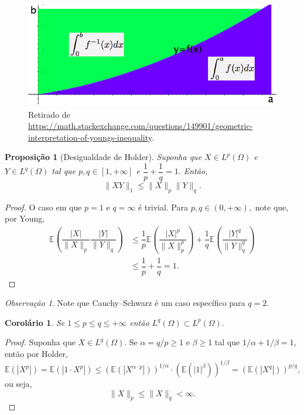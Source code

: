 \documentclass[12pt,a4paper,oneside]{book}
\newtheorem{proposition}[theorem]{Proposi\c{c}\~ao}
\newtheorem{corollary}[theorem]{Corol\'ario}
\theoremstyle{definition}
\theoremstyle{remark}
\newtheorem{remark}[theorem]{Observa\c{c}\~ao}
\numberwithin{equation}{section}
\newcommand{\E}{\mathbb{E}}
\begin{document}
\begin{figure}[h]\label{young-intuicao}
\centering %
\includegraphics[width=12cm]{intuicao-young} %
\caption{Retirado de \url{https://math.stackexchange.com/questions/149901/geometric-interpretation-of-youngs-inequality}.}
\end{figure}
 

\begin{proposition}[Desigualdade de Holder]
Suponha que $X\in L^p(\Omega)$ e $Y\in L^q(\Omega)$ tal que $p,q\in [1,+\infty]$ e 
$\dfrac{1}{p} +\dfrac{1}{q} = 1.$
Então, 
$$ \|XY\|_1\leq \|X \|_p\|Y\|_q .$$
\end{proposition}

\begin{proof}
O caso em que $p=1$ e $q=\infty$ é trivial. Para $p,q\in(0,+\infty),$ note que, por Young,
\begin{align*}
\E\left(\dfrac{|X|}{\|X\|_p}\dfrac{|Y|}{\|Y\|_q}\right) &\leq  \dfrac{1}{p}\E\left(\dfrac{|X|^p}{\|X\|^p_p}\right)+\dfrac{1}{q}\E\left(\dfrac{|Y|^q}{\|Y\|^q_q}\right)\\
&\leq  \dfrac{1}{p} + \dfrac{1}{q} = 1.
\end{align*}
\end{proof}

\begin{remark}
Note que Cauchy–Schwarz é um caso específico para $q=2.$
\end{remark}


\begin{corollary}
Se $1 \leq p\leq q\leq +\infty$ então $L^q(\Omega)\subset L^p(\Omega).$ 
\end{corollary}
\begin{proof}
Suponha que $X\in L^q(\Omega)$. Se $\alpha = q/p \geq 1$ e $\beta\geq 1$ tal que $1/\alpha+1/\beta = 1$, então por Holder, 
$$\E(|X^p|)=\E(|1\cdot X^p|) \leq (\E(|X^{\alpha\cdot p}|))^{1/\alpha}\cdot (\E(|1|^{\beta}))^{1/\beta} = (\E(|X^q|))^{p/q},$$
ou seja,
$$\|X\|_p \leq \|X\|_q<\infty. $$
\end{proof}
\end{document}
